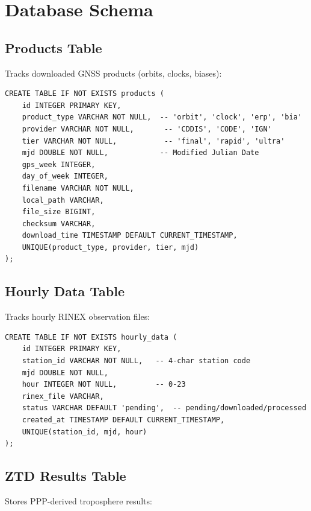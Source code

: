 \documentclass[11pt,a4paper,twoside]{report}
\begin{document}
\section{Database Schema}

\subsection{Products Table}

Tracks downloaded GNSS products (orbits, clocks, biases):

\begin{lstlisting}[style=sqlstyle, caption={Products Table Schema}, label={lst:products-schema}]
CREATE TABLE IF NOT EXISTS products (
    id INTEGER PRIMARY KEY,
    product_type VARCHAR NOT NULL,  -- 'orbit', 'clock', 'erp', 'bia'
    provider VARCHAR NOT NULL,       -- 'CDDIS', 'CODE', 'IGN'
    tier VARCHAR NOT NULL,           -- 'final', 'rapid', 'ultra'
    mjd DOUBLE NOT NULL,            -- Modified Julian Date
    gps_week INTEGER,
    day_of_week INTEGER,
    filename VARCHAR NOT NULL,
    local_path VARCHAR,
    file_size BIGINT,
    checksum VARCHAR,
    download_time TIMESTAMP DEFAULT CURRENT_TIMESTAMP,
    UNIQUE(product_type, provider, tier, mjd)
);
\end{lstlisting}

\subsection{Hourly Data Table}

Tracks hourly RINEX observation files:

\begin{lstlisting}[style=sqlstyle, caption={Hourly Data Table Schema}, label={lst:hourly-schema}]
CREATE TABLE IF NOT EXISTS hourly_data (
    id INTEGER PRIMARY KEY,
    station_id VARCHAR NOT NULL,   -- 4-char station code
    mjd DOUBLE NOT NULL,
    hour INTEGER NOT NULL,         -- 0-23
    rinex_file VARCHAR,
    status VARCHAR DEFAULT 'pending',  -- pending/downloaded/processed
    created_at TIMESTAMP DEFAULT CURRENT_TIMESTAMP,
    UNIQUE(station_id, mjd, hour)
);
\end{lstlisting}

\subsection{ZTD Results Table}

Stores PPP-derived troposphere results:
\end{document}
